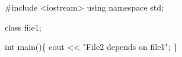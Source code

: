 
\begin{DoxyCode}
#include <iostream>
using namespace std;


class file1;

int main()\{
    cout << "File2 depends on file1";
\}
\end{DoxyCode}
 